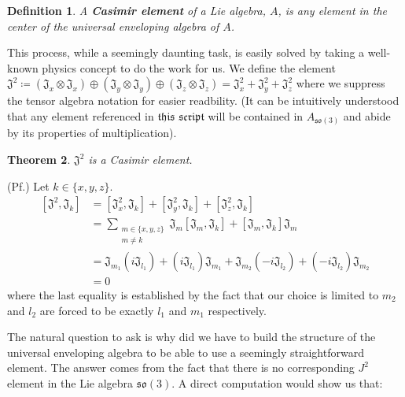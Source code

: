 \documentclass[10pt]{ucthesis}
\newtheorem{definition}{Definition}[chapter]
\newtheorem{theorem}[definition]{Theorem}
\begin{document}
\begin{definition}
	A \textbf{Casimir element} of a Lie algebra, $A$, is any element in the center of the universal enveloping algebra of $A$.
\end{definition}

This process, while a seemingly daunting task, is easily solved by taking a well-known physics concept to do the work for us. We define the element $\mathfrak{J^2} \coloneq (\mathfrak{J}_x \otimes \mathfrak{J}_x) \oplus (\mathfrak{J}_y \otimes \mathfrak{J}_y) \oplus (\mathfrak{J}_z \otimes \mathfrak{J}_z) = \mathfrak{J}_x^2 + \mathfrak{J}_y^2 + \mathfrak{J}_z^2$ where we suppress the tensor algebra notation for easier readbility. (It can be intuitively understood that any element referenced in $\mathfrak{this}$ $\mathfrak{script}$ will be contained in $A_{\mathfrak{so(3)}}$ and abide by its properties of multiplication).

\begin{theorem}
	$\mathfrak{J^2}$ is a Casimir element.
\end{theorem}

\noindent (Pf.) Let $k\in \{x,y,z\}$.
\begin{equation}
\begin{aligned}
	[\mathfrak{J^2}, \mathfrak{J}_k] &= [\mathfrak{J}_x^2, \mathfrak{J}_k] + [\mathfrak{J}_y^2, \mathfrak{J}_k] + [\mathfrak{J}_z^2, \mathfrak{J}_k]\\
										 &=\sum_{\substack{m\in\{x,y,z\} \\ m\neq k}} \mathfrak{J}_m [\mathfrak{J}_m, \mathfrak{J}_k] + [\mathfrak{J}_m, \mathfrak{J}_k]\mathfrak{J}_m\\
										&= \mathfrak{J}_{m_1}(i\mathfrak{J}_{l_1})+ (i\mathfrak{J}_{l_1}) \mathfrak{J}_{m_1} + \mathfrak{J}_{m_2}(-i\mathfrak{J}_{l_2}) +(-i\mathfrak{J}_{l_2}) \mathfrak{J}_{m_2} \\
										&= 0
\end{aligned}
\end{equation}
where the last equality is established by the fact that our choice is limited to $m_2$ and $l_2$ are forced to be exactly $l_1$ and $m_1$ respectively. \qedsymbol

The natural question to ask is why did we have to build the structure of the universal enveloping algebra to be able to use a seemingly straightforward element. The answer comes from the fact that there is no corresponding $J^2$ element in the Lie algebra $\mathfrak{so(3)}$. A direct computation would show us that:
\end{document}
